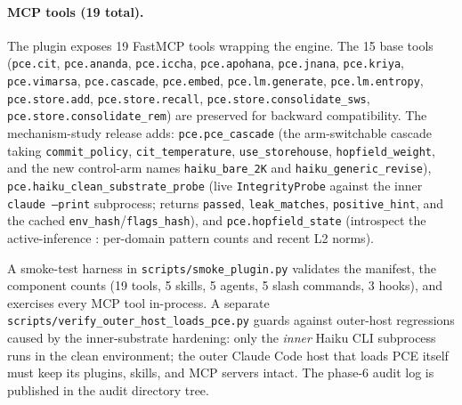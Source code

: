 \paragraph{MCP tools (19 total).} The plugin exposes 19 FastMCP tools wrapping the engine. The 15 base tools (\texttt{pce.cit}, \texttt{pce.ananda}, \texttt{pce.iccha}, \texttt{pce.apohana}, \texttt{pce.jnana}, \texttt{pce.kriya}, \texttt{pce.vimarsa}, \texttt{pce.cascade}, \texttt{pce.embed}, \texttt{pce.lm.generate}, \texttt{pce.lm.entropy}, \texttt{pce.store.add}, \texttt{pce.store.recall}, \texttt{pce.store.consolidate\_sws}, \texttt{pce.store.consolidate\_rem}) are preserved for backward compatibility. The mechanism-study release adds: \texttt{pce.pce\_cascade} (the arm-switchable cascade taking \texttt{commit\_policy}, \texttt{cit\_temperature}, \texttt{use\_storehouse}, \texttt{hopfield\_weight}, and the new control-arm names \texttt{haiku\_bare\_2K} and \texttt{haiku\_generic\_revise}), \texttt{pce.haiku\_clean\_substrate\_probe} (live \texttt{IntegrityProbe} against the inner \texttt{claude --print} subprocess; returns \texttt{passed}, \texttt{leak\_matches}, \texttt{positive\_hint}, and the cached \texttt{env\_hash}/\texttt{flags\_hash}), and \texttt{pce.hopfield\_state} (introspect the active-inference : per-domain pattern counts and recent L2 norms).

A smoke-test harness in \texttt{scripts/smoke\_plugin.py} validates the manifest, the component counts (19 tools, 5 skills, 5 agents, 5 slash commands, 3 hooks), and exercises every MCP tool in-process. A separate \texttt{scripts/verify\_outer\_host\_loads\_pce.py} guards against outer-host regressions caused by the inner-substrate hardening: only the \emph{inner} Haiku CLI subprocess runs in the clean environment; the outer Claude Code host that loads PCE itself must keep its plugins, skills, and MCP servers intact. The phase-6 audit log is published in the audit directory tree.

